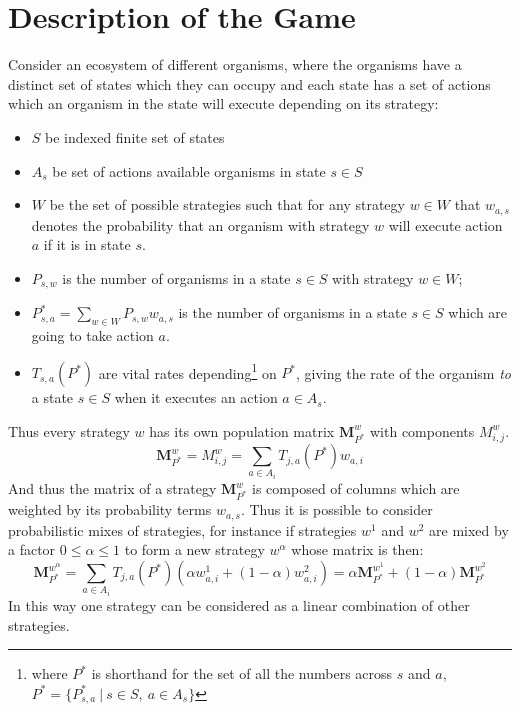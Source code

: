 \section{Description of the Game}\label{section:formalism}

Consider an ecosystem of different organisms, where the organisms have a distinct set of states which they can occupy and each state has a set of actions which an organism in the state will execute depending on its strategy:

\begin{itemize}[leftmargin=*,labelsep=4mm]
\item	$S$ be indexed finite set of states
\item   $A_s$ be set of actions available organisms in state $s\in S$
\item   $W$ be the set of possible strategies such that for any strategy $w \in W$ that $w_{a,s}$ denotes the probability that an organism with strategy $w$ will execute action $a$ if it is in state $s$.
\item	$P_{s,w}$ is the number of organisms in a state $s\in S$ with strategy $w\in W$; 
\item   $P^*_{s,a} = \sum_{w\in W}P_{s,w}w_{a,s}$ is the number of organisms in a state $s\in S$ which are going to take action $a$.
\item   $T_{s,a}(P^*)$ are vital rates depending\footnote{where $P^*$ is shorthand for the set of all the numbers across $s$ and $a$,  $P^* = \{P^*_{s,a}~|~s\in S,~a\in A_s\}$} on $P^*$, giving the rate of the organism \textit{to} a state $s\in S$ when it executes an action $a\in A_s$.
\end{itemize}



Thus every strategy $w$ has its own population matrix $\mathbf{M}_{P^*}^w$ with components $M^{w}_{i,j}$.%
\begin{equation}\label{eq:transmission_matrix}\mathbf{M}_{P^*}^w = M^{w}_{i,j} = \sum_{a\in A_i}T_{j,a}(P^*) w_{a,i}\end{equation}
And thus the matrix of a strategy $\mathbf{M}_{P^*}^w$ is composed of columns which are weighted by its probability terms $w_{a,s}$.
Thus it is possible to consider probabilistic mixes of strategies, for instance if strategies $w^1$ and $w^2$ are mixed by a factor $0\le\alpha\le 1$ to form a new strategy $w^\alpha$ whose matrix is then:
\begin{equation}\label{eq:transmission_matrix2}\mathbf{M}_{P^*}^{w^\alpha} = \sum_{a\in A_i}T_{j,a}(P^*) \left(\alpha w^1_{a,i}+(1-\alpha)w^2_{a,i}\right) = \alpha\mathbf{M}_{P^*}^{w^1} + (1-\alpha)\mathbf{M}_{P^*}^{w^2}\end{equation}
In this way one strategy can be considered as a linear combination of other strategies.
